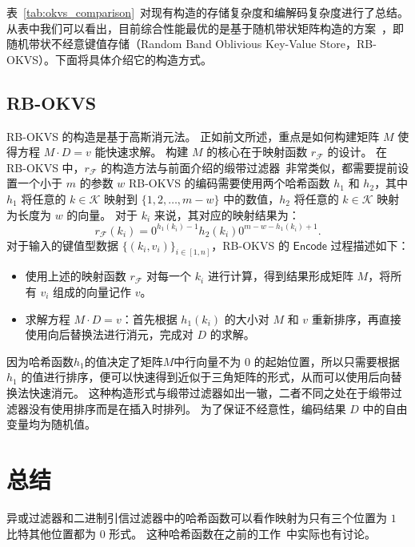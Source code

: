 表~\ref{tab:okvs_comparison}~对现有构造的存储复杂度和编解码复杂度进行了总结。
从表中我们可以看出，目前综合性能最优的是基于随机带状矩阵构造的方案~\cite{bienstock2023NearOptimal}，即随机带状不经意键值存储（Random Band Oblivious Key-Value Store，RB-OKVS）。下面将具体介绍它的构造方式。

\subsection{RB-OKVS}

RB-OKVS 的构造是基于高斯消元法。
正如前文所述，重点是如何构建矩阵 $M$ 使得方程 $M\cdot D = v$ 能快速求解。
构建 $M$ 的核心在于映射函数 $r_{\mathcal{F}}$ 的设计。
在 RB-OKVS 中，$r_{\mathcal{F}}$ 的构造方法与前面介绍的缎带过滤器~\cite{dillinger2021ribbon}非常类似，都需要提前设置一个小于 $m$ 的参数 $w$
RB-OKVS 的编码需要使用两个哈希函数 $h_1$ 和 $h_2$，其中 $h_1$ 将任意的 $k\in \mathcal{K}$ 映射到 $\{1, 2, \ldots, m-w\}$ 中的数值，$h_2$ 将任意的 $k\in \mathcal{K}$ 映射为长度为 $w$ 的向量。
对于 $k_i$ 来说，其对应的映射结果为：
\begin{equation}
  r_{\mathcal{F}}(k_i) = 0^{h_1(k_i) - 1}h_2(k_i)0^{m - w - h_1(k_i) + 1}.
\end{equation}
对于输入的键值型数据 $\{(k_i, v_i)\}_{i\in[1,n]}$，RB-OKVS 的 $\mathsf{Encode}$ 过程描述如下：
\begin{itemize}
  \item 使用上述的映射函数 $r_{\mathcal{F}}$ 对每一个 $k_i$ 进行计算，得到结果形成矩阵 $M$，将所有 $v_i$ 组成的向量记作 $v$。
  \item 求解方程 $M\cdot D = v$：首先根据 $h_1(k_i)$ 的大小对 $M$ 和 $v$ 重新排序，再直接使用向后替换法进行消元，完成对 $D$ 的求解。
\end{itemize}
因为哈希函数$h_1$的值决定了矩阵$M$中行向量不为 $0$ 的起始位置，所以只需要根据 $h_1$ 的值进行排序，便可以快速得到近似于三角矩阵的形式，从而可以使用后向替换法快速消元。
这种构造形式与缎带过滤器如出一辙，二者不同之处在于缎带过滤器没有使用排序而是在插入时排列。
为了保证不经意性，编码结果 $D$ 中的自由变量均为随机值。


\section{总结}

异或过滤器和二进制引信过滤器中的哈希函数可以看作映射为只有三个位置为 $1$ 比特其他位置都为 $0$ 形式。
这种哈希函数在之前的工作~\cite{botelho2013Practical,genuzio2016Fast}中实际也有讨论。